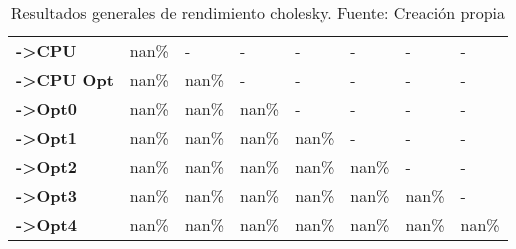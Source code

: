 \begin{table}[H]
\begin{tabular}{llllllll}
    \rowcolor[HTML]{EFEFEF} \cellcolor[HTML]{DAE8FC} \textbf{->CPU} & nan\% & - & - & - & - & - & - \\
    \cellcolor[HTML]{DAE8FC} \textbf{->CPU Opt} & nan\% & nan\% & - & - & - & - & - \\
    \rowcolor[HTML]{EFEFEF} \cellcolor[HTML]{DAE8FC} \textbf{->Opt0} & nan\% & nan\% & nan\% & - & - & - & - \\
    \cellcolor[HTML]{DAE8FC} \textbf{->Opt1} & nan\% & nan\% & nan\% & nan\% & - & - & - \\
    \rowcolor[HTML]{EFEFEF} \cellcolor[HTML]{DAE8FC} \textbf{->Opt2} & nan\% & nan\% & nan\% & nan\% & nan\% & - & - \\
    \cellcolor[HTML]{DAE8FC} \textbf{->Opt3} & nan\% & nan\% & nan\% & nan\% & nan\% & 	nan\% & - \\
    \rowcolor[HTML]{EFEFEF} \cellcolor[HTML]{DAE8FC} \textbf{->Opt4} & nan\% & nan\% & nan\% & nan\% & nan\% & 	nan\% & 	nan\% \\
    \end{tabular}
    \caption[Resultados generales de rendimiento cholesky]{{Resultados generales de rendimiento cholesky. Fuente: Creación propia}}
    \label{table_global_cholesky_PerformanceResults_speedup}
\end{table}